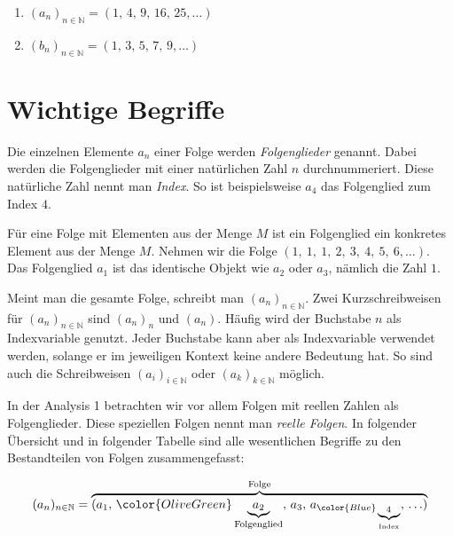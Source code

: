 \documentclass[fontsize=9pt,
               parskip=half-,
               DIV=14,
               listof=chapterentry,
               tocflat]{scrbook}
\begin{document}
\begin{answer*}
\begin{enumerate}
\item $(a_{n})_{n\in \mathbb {N} }=(1,\,4,\,9,\,16,\,25,\ldots )$
\item $(b_{n})_{n\in \mathbb {N} }=(1,\,3,\,5,\,7,\,9,\ldots )$
\end{enumerate}

\end{answer*}

\section{Wichtige Begriffe}

Die einzelnen Elemente $a_{n}$ einer Folge werden \emph{Folgenglieder} genannt. Dabei werden die Folgenglieder mit einer natürlichen Zahl $n$ durchnummeriert. Diese natürliche Zahl nennt man \emph{Index}. So ist beispielsweise $a_{4}$ das Folgenglied zum Index $4$.

Für eine Folge mit Elementen aus der Menge $M$ ist ein Folgenglied ein konkretes Element aus der Menge $M$. Nehmen wir die Folge $(1,\ 1,\ 1,\ 2,\ 3,\ 4,\ 5,\ 6,\ldots )$. Das Folgenglied $a_{1}$ ist das identische Objekt wie $a_{2}$ oder $a_{3}$, nämlich die Zahl $1$.

Meint man die gesamte Folge, schreibt man $\left(a_{n}\right)_{n\in \mathbb {N} }$. Zwei Kurzschreibweisen für $\left(a_{n}\right)_{n\in \mathbb {N} }$ sind $(a_{n})_{n}$ und $(a_{n})$. Häufig wird der Buchstabe $n$ als Indexvariable genutzt. Jeder Buchstabe kann aber als Indexvariable verwendet werden, solange er im jeweiligen Kontext keine andere Bedeutung hat. So sind auch die Schreibweisen $\left(a_{i}\right)_{i\in \mathbb {N} }$ oder $\left(a_{k}\right)_{k\in \mathbb {N} }$ möglich.

In der Analysis 1 betrachten wir vor allem Folgen mit reellen Zahlen als Folgenglieder. Diese speziellen Folgen nennt man \emph{reelle Folgen}. In folgender Übersicht und in folgender Tabelle sind alle wesentlichen Begriffe zu den Bestandteilen von Folgen zusammengefasst:

\begin{align*}
(a_{n})_{n\in \mathbb {N} }=\overbrace {(a_{1},\,{\color {OliveGreen}\underbrace {a_{2}} _{\text{Folgenglied}}},\,a_{3},\,a_{\color {Blue}\underbrace {{}_{4}} _{\text{Index}}},\,\ldots )} ^{\text{Folge}}
\end{align*}


\renewcommand{\arraystretch}{1.5}
\end{document}
